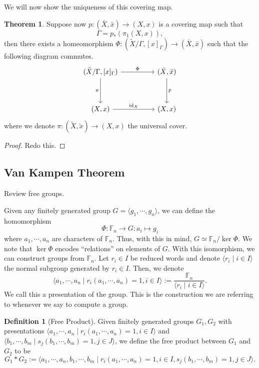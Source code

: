 \documentclass[]{article}
\theoremstyle{definition}
\newtheorem{theorem}{Theorem}
\theoremstyle{definition}
\newtheorem{definition}{Definition}[section]
\begin{document}
We will now show the uniqueness of this covering map. 

\begin{theorem}
  Suppose now \(p : (\bar X, \bar x) \to (X, x)\) is a covering map such that 
  \[\Gamma = p_*(\pi_1(X, x)),\]
  then there exists a homeomorphism 
  \(\Phi : (\tilde X / \Gamma, [x]_\Gamma) \to (\bar X, \bar x)\) such that 
  the following diagram commutes.
  \[\begin{tikzcd}
    {(\tilde X / \Gamma, [x]_\Gamma)} && {(\bar X, \bar x)} \\
    \\
    {(X, x)} && {(X, x)}
    \arrow["\pi"', from=1-1, to=3-1]
    \arrow["p", from=1-3, to=3-3]
    \arrow["\Phi", from=1-1, to=1-3]
    \arrow["{\text{id}_X}", from=3-1, to=3-3]
  \end{tikzcd}\]
  where we denote \(\pi : (\tilde X, \tilde x) \to (X, x)\) the universal 
  cover.
\end{theorem}
\begin{proof}
  Redo this.
\end{proof}

\subsection{Van Kampen Theorem}

Review free groups. 

Given any finitely generated group \(G = \langle g_1, \cdots, g_n\rangle\), 
we can define the homomorphism 
\[\Phi : \mathbb{F}_n \to G : a_i \mapsto g_i\]
where \(a_1, \cdots, a_n\) are characters of \(\mathbb{F}_n\). Thus, with this 
in mind, \(G \simeq \mathbb{F}_n/ \ker \Phi\). We note that \(\ker \Phi\) encodes 
``relations'' on elements of \(G\). With this isomorphism, we can construct 
groups from \(\mathbb{F}_n\). Let \(r_i \in I\) be reduced words and 
denote \(\langle r_i \mid i \in I\rangle\) the normal subgroup generated 
by \(r_i \in I\). Then, we denote 
\[\langle a_1, \cdots, a_n \mid r_i(a_1, \cdots, a_n) = 1, 
  i \in I\rangle := \frac{\mathbb{F}_n}{\langle r_i \mid i \in I\rangle}.\]
We call this a presentation of the group. This is the construction we are 
referring to whenever we say to compute a group. 

\begin{definition}[Free Product]
  Given finitely generated groups \(G_1, G_2\) with presentations 
  \(\langle a_1, \cdots, a_n \mid r_i(a_1, \cdots, a_n) = 1, i \in I\rangle\) 
  and \(\langle b_1, \cdots, b_m \mid s_j(b_1, \cdots, b_m) = 1, j \in J\rangle\),
  we define the free product between \(G_1\) and \(G_2\) to be 
  \[G_1 * G_2 := \langle a_1, \cdots, a_n, b_1, \cdots, b_m \mid 
  r_i(a_1, \cdots, a_n) = 1, i \in I, s_j(b_1, \cdots, b_m) = 1, 
  j \in J\rangle.\]
\end{definition}
\end{document}
